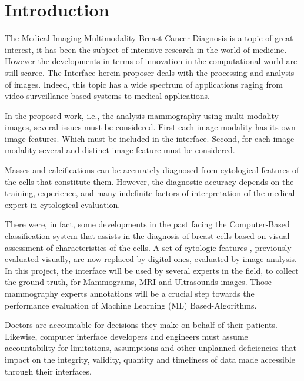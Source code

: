 
\chapter{Introduction}
\label{chapter:introduction}

The Medical Imaging Multimodality Breast Cancer Diagnosis is a topic of great interest, it has been the subject of intensive research in the world of medicine. However the developments in terms of innovation in the computational world are still scarce. The Interface herein proposer deals with the processing and analysis of images. Indeed, this topic has a wide spectrum of applications raging from video surveillance based systems to medical applications.

In the proposed work, i.e., the analysis mammography using multi-modality images, several issues must be considered. First each image modality has its own image features. Which must be included in the interface. Second, for each image modality several and distinct image feature must be considered.

Masses and calcifications can be accurately diagnosed from cytological features \cite{Mangasarian95breastcancer} of the cells that constitute them. However, the diagnostic accuracy depends on the training, experience, and many indefinite factors of interpretation of the medical expert in cytological evaluation.

There were, in fact, some developments in the past facing the Computer-Based classification system \cite{Bennett92robustlinear, Mangasarian98multisurfacemethod} that assists in the diagnosis of breast cells based on visual assessment of characteristics of the cells. A set of cytologic features \cite{Wolberg90}, previously evaluated visually, are now replaced by digital ones, evaluated by image analysis. In this project, the interface will be used by several experts in the field, to collect the ground truth, for Mammograms, MRI and Ultrasounds images. Those mammography experts annotations will be a crucial step towards the performance evaluation of Machine Learning (ML) Based-Algorithms.

Doctors are accountable for decisions they make on behalf of their patients. Likewise, computer interface developers and engineers must assume accountability for limitations, assumptions and other unplanned deficiencies that impact on the integrity, validity, quantity and timeliness of data made accessible through their interfaces.

